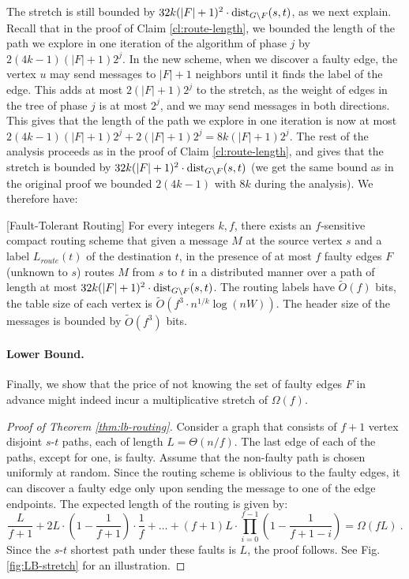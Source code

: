 The stretch is still bounded by $32k (|F|+1)^2\cdot \mbox{\rm dist}_{G \setminus F}(s,t)$, as we next explain. Recall that in the proof of Claim \ref{cl:route-length}, we bounded the length of the path we explore in one iteration of the algorithm of phase $j$ by $2(4k-1)(|F|+1)2^j.$ In the new scheme, when we discover a faulty edge, the vertex $u$ may send messages to $|F|+1$ neighbors until it finds the label of the edge. This adds at most $2(|F|+1)2^j$ to the stretch, as the weight of edges in the tree of phase $j$ is at most $2^j$, and we may send messages in both directions. This gives that the length of the path we explore in one iteration is now at most $2(4k-1)(|F|+1)2^j+2(|F|+1)2^j=8k(|F|+1)2^j.$ The rest of the analysis proceeds as in the proof of Claim \ref{cl:route-length}, and gives that the stretch is bounded by $32k (|F|+1)^2\cdot \mbox{\rm dist}_{G \setminus F}(s,t)$ (we get the same bound as in the original proof we bounded $2(4k-1)$ with $8k$ during the analysis).
We therefore have:
\begin{theorem}\label{thm:routing-unknown}[Fault-Tolerant Routing]
For every integers $k,f$, there exists an $f$-sensitive compact routing scheme that given a message $M$ at the source vertex $s$ and a label $L_{route}(t)$ of the destination $t$, in the presence of at most $f$ faulty edges $F$ (unknown to $s$) routes $M$ from $s$ to $t$ in a distributed manner over a path of length at most $32k (|F|+1)^2\cdot \mbox{\rm dist}_{G \setminus F}(s,t)$. The routing labels have $\widetilde{O}(f)$ bits, the table size of each vertex is $\widetilde{O}(f^3 \cdot n^{1/k} \log(nW))$. The header size of the messages is bounded by $\widetilde{O}(f^3)$ bits. 
\end{theorem}


\paragraph{Lower Bound.} Finally, we show that the price of not knowing the set of faulty edges $F$ in advance might indeed incur a multiplicative stretch of $\Omega(f)$. 

\begin{proof}[Proof of Theorem \ref{thm:lb-routing}]
Consider a graph that consists of $f+1$ vertex disjoint $s$-$t$ paths, each of length $L=\Theta(n/f)$. The last edge of each of the paths, except for one, is faulty. Assume that the non-faulty path is chosen uniformly at random. Since the routing scheme is oblivious to the faulty edges, it can discover a faulty edge only upon sending the message to one of the edge endpoints. The expected length of the routing is given by:
$$\frac{L}{f+1} +2L \cdot \left(1-\frac{1}{f+1} \right)\cdot \frac{1}{f} + \ldots+ \left(f+1\right)L\cdot \prod_{i=0}^{f-1} \left(1-\frac{1}{f+1-i}\right)=\Omega(f L)~.$$ 
Since the $s$-$t$ shortest path under these faults is $L$, the proof follows. See Fig. \ref{fig:LB-stretch} for an illustration.
\end{proof}


